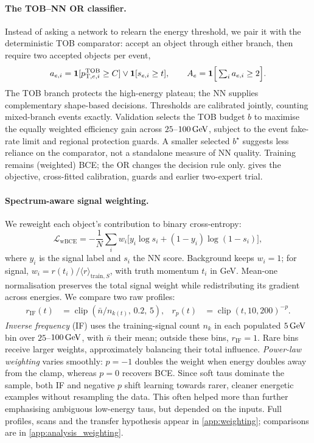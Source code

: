 \paragraph{The TOB--NN OR classifier.}
Instead of asking a network to relearn the energy threshold, we pair it with the deterministic TOB comparator: accept an object through either branch, then require two accepted objects per event,
\begin{equation}
  a_{e,i}=\mathbf{1}[p_{\mathrm{T},e,i}^{\mathrm{TOB}}\geq C]\vee\mathbf{1}[s_{e,i}\geq t],\qquad A_e=\mathbf{1}\Big[\textstyle\sum_i a_{e,i}\geq2\Big].
  \label{eq:or}
\end{equation}
The TOB branch protects the high-energy plateau; the NN supplies complementary shape-based decisions. Thresholds are calibrated jointly, counting mixed-branch events exactly. Validation selects the TOB budget $b$ to maximise the equally weighted efficiency gain across $25$--$100\,\mathrm{GeV}$, subject to the event fake-rate limit and regional protection guards. A smaller selected $b^\star$ suggests less reliance on the comparator, not a standalone measure of NN quality. Training remains (weighted) BCE; the OR changes the decision rule only.  gives the objective, cross-fitted calibration, guards and earlier two-expert trial.

\paragraph{Spectrum-aware signal weighting.}
We reweight each object's contribution to binary cross-entropy:
\begin{equation}
  \mathcal L_{\mathrm{wBCE}}=-\frac1N\sum_i w_i\big[y_i\log s_i+(1-y_i)\log(1-s_i)\big],
  \label{eq:weighted_bce}
\end{equation}
where $y_i$ is the signal label and $s_i$ the NN score. Background keeps $w_i=1$; for signal, $w_i=r(t_i)/\langle r\rangle_{\mathrm{train},S}$, with truth momentum $t_i$ in GeV. Mean-one normalisation preserves the total signal weight while redistributing its gradient across energies. We compare two raw profiles:
\begin{equation}
  \begin{aligned}
    r_{\mathrm{IF}}(t)&=\operatorname{clip}\!\left(\bar n/n_{k(t)},\,0.2,\,5\right),
    & r_p(t)&=\operatorname{clip}(t,10,200)^{-p}.
  \end{aligned}
  \label{eq:powerlaw}
\end{equation}
\emph{Inverse frequency} (IF) uses the training-signal count $n_k$ in each populated $5\,\mathrm{GeV}$ bin over $25$--$100\,\mathrm{GeV}$, with $\bar n$ their mean; outside these bins, $r_{\mathrm{IF}}=1$. Rare bins receive larger weights, approximately balancing their total influence. \emph{Power-law weighting} varies smoothly: $p=-1$ doubles the weight when energy doubles away from the clamp, whereas $p=0$ recovers BCE. Since soft taus dominate the sample, both IF and negative $p$ shift learning towards rarer, cleaner energetic examples without resampling the data. This often helped more than further emphasising ambiguous low-energy taus, but depended on the inputs. Full profiles, scans and the transfer hypothesis appear in \cref{app:weighting}; comparisons are in \cref{app:analysis_weighting}.


